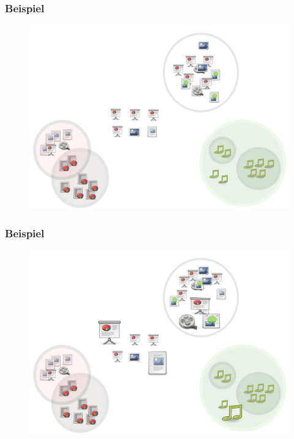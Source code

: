 \begin{frame}

\frametitle{Beispiel}
\label{beispiel}

\begin{figure}[htbp]
\centering
\includegraphics[keepaspectratio,width=\textwidth,height=0.75\textheight]{04.png}
\label{}
\end{figure}


\end{frame}

\begin{frame}

\frametitle{Beispiel}
\label{beispiel}

\begin{figure}[htbp]
\centering
\includegraphics[keepaspectratio,width=\textwidth,height=0.75\textheight]{05.png}
\label{}
\end{figure}


\end{frame}

